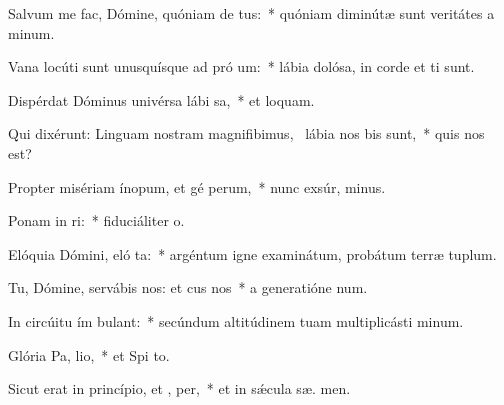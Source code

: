 \item Salvum me fac, Dómine, quóniam de tus:~* quóniam diminútæ sunt veritátes a  minum.
\item Vana locúti sunt unusquísque ad pró um:~* lábia dolósa, in corde et  ti sunt.
\item Dispérdat Dóminus univérsa lábi sa,~* et  loquam.
\item Qui dixérunt: Linguam nostram magnifibimus,~\pscross{} lábia nos  bis sunt,~* quis nos  est?
\item Propter misériam ínopum, et gé perum,~* nunc exsúr,  minus.
\item Ponam in ri:~* fiduciáliter   o.
\item Elóquia Dómini, eló ta:~* argéntum igne examinátum, probátum terræ  tuplum.
\item Tu, Dómine, servábis nos: et cus nos~* a generatióne   num.
\item In circúitu ím bulant:~* secúndum altitúdinem tuam multiplicásti  minum.
\item Glória Pa,  lio,~* et Spi to.
\item Sicut erat in princípio, et ,  per,~* et in sǽcula sæ. men.

